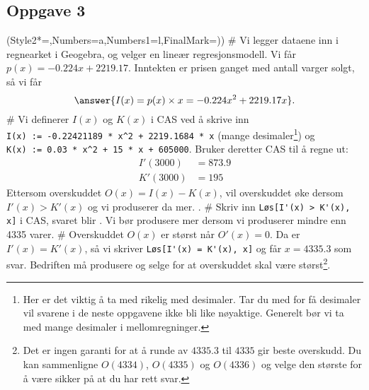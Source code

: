 \subsection*{Oppgave 3}
\begin{easylist}[enumerate]
	\ListProperties(Style2*=,Numbers=a,Numbers1=l,FinalMark={)})
	# Vi legger dataene inn i regnearket i Geogebra, og velger en lineær regresjonsmodell. Vi får $p(x) = -0.224x +2219.17$.
	Inntekten er prisen ganget med antall varger solgt, så vi får
	\begin{equation*}
		\answer{I(x) = p(x) \times x = -0.224x^2 +2219.17x}.
	\end{equation*}
	# Vi definerer $I(x)$ og $K(x)$ i CAS ved å skrive inn \\
	\verb|I(x) := -0.22421189 * x^2 + 2219.1684 * x| (mange desimaler\footnote{Her er det viktig å ta med rikelig med desimaler. Tar du med for få desimaler vil svarene i de neste oppgavene ikke bli like nøyaktige. Generelt bør vi ta med mange desimaler i mellomregninger.})
	og  \\
	\verb|K(x) := 0.03 * x^2 + 15 * x + 605000|.
	Bruker deretter CAS til å regne ut:
	\begin{align*}
		I'(3000) &= 873.9\\
		K'(3000) &= 195
	\end{align*}
	Ettersom overskuddet $O(x) = I(x)  - K(x)$, vil overskuddet øke
	dersom $I'(x) > K'(x)$ og vi produserer da mer.
	.
	# Skriv inn \verb|Løs[I'(x) > K'(x), x]| i CAS, svaret blir
	.
	Vi bør produsere mer dersom vi produserer mindre enn 4335 varer.
	# Overskuddet $O(x)$ er størst når $O'(x) = 0$.
	Da er $I'(x) = K'(x)$, så vi skriver \verb|Løs[I'(x) = K'(x), x]|
	og får $x = 4335.3$ som svar. Bedriften må produsere og selge
	 for at overskuddet skal være størst\footnote{Det er ingen garanti for at å runde av $4335.3$ til $4335$ gir beste overskudd. Du kan sammenligne $O(4334)$, $O(4335)$ og $O(4336)$ og velge den største for å være sikker på at du har rett svar.}.
\end{easylist}

